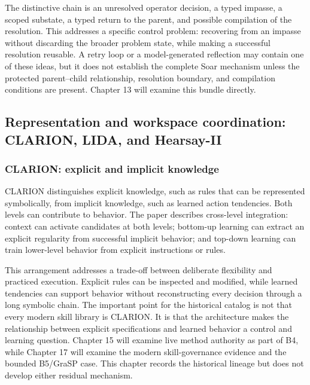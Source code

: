 The distinctive chain is an unresolved operator decision, a typed impasse, a scoped substate, a typed return to the parent, and possible compilation of the resolution. This addresses a specific control problem: recovering from an impasse without discarding the broader problem state, while making a successful resolution reusable. A retry loop or a model-generated reflection may contain one of these ideas, but it does not establish the complete Soar mechanism unless the protected parent--child relationship, resolution boundary, and compilation conditions are present. Chapter 13 will examine this bundle directly.

\subsection{Representation and workspace coordination: CLARION, LIDA, and Hearsay-II}
\label{sec:ch11-clarion-lida-hearsay}

\subsubsection{CLARION: explicit and implicit knowledge}

CLARION distinguishes explicit knowledge, such as rules that can be represented symbolically, from implicit knowledge, such as learned action tendencies. Both levels can contribute to behavior. The paper describes cross-level integration: context can activate candidates at both levels; bottom-up learning can extract an explicit regularity from successful implicit behavior; and top-down learning can train lower-level behavior from explicit instructions or rules.

This arrangement addresses a trade-off between deliberate flexibility and practiced execution. Explicit rules can be inspected and modified, while learned tendencies can support behavior without reconstructing every decision through a long symbolic chain. The important point for the historical catalog is not that every modern skill library is CLARION. It is that the architecture makes the relationship between explicit specifications and learned behavior a control and learning question. Chapter 15 will examine live method authority as part of B4, while Chapter 17 will examine the modern skill-governance evidence and the bounded B5/GraSP case. This chapter records the historical lineage but does not develop either residual mechanism.

